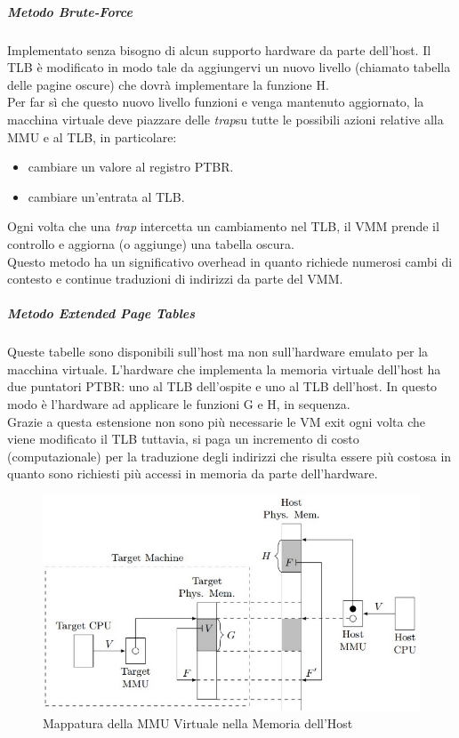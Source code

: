 \documentclass{article}
\begin{document}
\subparagraph{Metodo Brute-Force}
Implementato senza bisogno di alcun supporto hardware da parte dell’host. Il TLB è modificato in modo tale da aggiungervi un nuovo livello (chiamato tabella delle pagine oscure) che dovrà implementare la funzione H.\\
Per far sì che questo nuovo livello funzioni e venga mantenuto aggiornato, la macchina virtuale deve piazzare delle \textit{trap}\footnotemark  su tutte le possibili azioni relative alla MMU e al TLB, in particolare:
\begin{itemize}
    \item cambiare un valore al registro PTBR.
    \item cambiare un’entrata al TLB.
\end{itemize}
Ogni volta che una \textit{trap} intercetta un cambiamento nel TLB, il VMM prende il controllo e aggiorna (o aggiunge) una tabella oscura.\\
Questo metodo ha un significativo overhead in quanto richiede numerosi cambi di contesto e continue traduzioni di indirizzi da parte del VMM.

\subparagraph{Metodo Extended Page Tables}
Queste tabelle sono disponibili sull’host ma non sull’hardware emulato per la macchina virtuale. L’hardware che implementa la memoria virtuale dell’host ha due puntatori PTBR: uno al TLB dell’ospite e uno al TLB dell’host. In questo modo è l’hardware ad applicare le funzioni G e H, in sequenza.\\
Grazie a questa estensione non sono più necessarie le VM exit ogni volta che viene modificato il TLB tuttavia, si paga un incremento di costo (computazionale) per la traduzione degli indirizzi che risulta essere più costosa in quanto sono richiesti più accessi in memoria da parte dell’hardware\footnotemark.


\begin{figure}[H]
\centering
\includegraphics[scale=1]{img/mmu.jpg}
\caption{Mappatura della MMU Virtuale nella Memoria dell'Host}
\end{figure}
\end{document}
